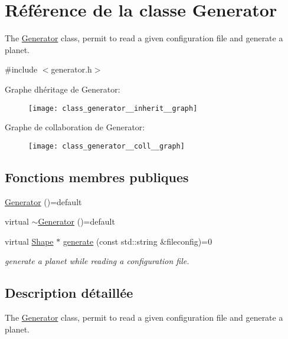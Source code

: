 \hypertarget{class_generator}{}\section{Référence de la classe Generator}
\label{class_generator}


The \hyperlink{class_generator}{Generator} class, permit to read a given configuration file and generate a planet.  




{\ttfamily \#include $<$generator.\+h$>$}



Graphe d\textquotesingle{}héritage de Generator\+:
\nopagebreak
\begin{figure}[H]
\begin{center}
\leavevmode
\texttt{[image: class\_generator\_\_inherit\_\_graph]}
\end{center}
\end{figure}


Graphe de collaboration de Generator\+:\nopagebreak
\begin{figure}[H]
\begin{center}
\leavevmode
\texttt{[image: class\_generator\_\_coll\_\_graph]}
\end{center}
\end{figure}
\subsection*{Fonctions membres publiques}
\begin{DoxyCompactItemize}
\item 
\hyperlink{class_generator_aae25f1e872541b353e40fb0e4ee0dd45}{Generator} ()=default
\item 
virtual \hyperlink{class_generator_a175792ff2622a6ce48bf2adab7e09e58}{$\sim$\+Generator} ()=default
\item 
virtual \hyperlink{class_shape}{Shape} $\ast$ \hyperlink{class_generator_a0a421843bba544df32c3e10478eaabc7}{generate} (const std\+::string \&fileconfig)=0
\begin{DoxyCompactList}\small\item\em generate a planet while reading a configuration file. \end{DoxyCompactList}\end{DoxyCompactItemize}


\subsection{Description détaillée}
The \hyperlink{class_generator}{Generator} class, permit to read a given configuration file and generate a planet. 

